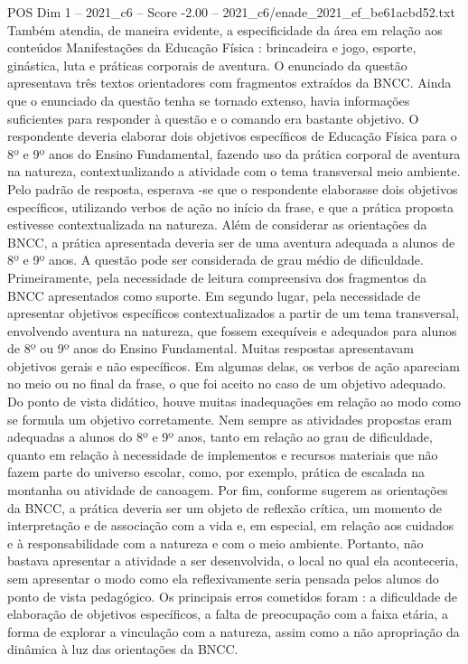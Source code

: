 \begin{textsample}{POS Dim 1 – 2021\_c6 – Score -2.00 – 2021\_c6/enade\_2021\_ef\_be61acbd52.txt}
Também atendia, de maneira evidente, a especificidade da área em relação aos conteúdos Manifestações da Educação Física : brincadeira e jogo, esporte, ginástica, luta e práticas corporais de aventura.
O enunciado da questão apresentava três textos orientadores com fragmentos extraídos da BNCC.
Ainda que o enunciado da questão tenha se tornado extenso, havia informações suficientes para responder à questão e o comando era bastante objetivo.
O respondente deveria elaborar dois objetivos específicos de Educação Física para o 8º e 9º anos do Ensino Fundamental, fazendo uso da prática corporal de aventura na natureza, contextualizando a atividade com o tema transversal meio ambiente.
Pelo padrão de resposta, esperava -se que o respondente elaborasse dois objetivos específicos, utilizando verbos de ação no início da frase, e que a prática proposta estivesse contextualizada na natureza.
Além de considerar as orientações da BNCC, a prática apresentada deveria ser de uma aventura adequada a alunos de 8º e 9º anos.
A questão pode ser considerada de grau médio de dificuldade.
Primeiramente, pela necessidade de leitura compreensiva dos fragmentos da BNCC apresentados como suporte.
Em segundo lugar, pela necessidade de apresentar objetivos específicos contextualizados a partir de um tema transversal, envolvendo aventura na natureza, que fossem exequíveis e adequados para alunos de 8º ou 9º anos do Ensino Fundamental.
Muitas respostas apresentavam objetivos gerais e não específicos.
Em algumas delas, os verbos de ação apareciam no meio ou no final da frase, o que foi aceito no caso de um objetivo adequado.
Do ponto de vista didático, houve muitas inadequações em relação ao modo como se formula um objetivo corretamente.
Nem sempre as atividades propostas eram adequadas a alunos do 8º e 9º anos, tanto em relação ao grau de dificuldade, quanto em relação à necessidade de implementos e recursos materiais que não fazem parte do universo escolar, como, por exemplo, prática de escalada na montanha ou atividade de canoagem.
Por fim, conforme sugerem as orientações da BNCC, a prática deveria ser um objeto de reflexão crítica, um momento de interpretação e de associação com a vida e, em especial, em relação aos cuidados e à responsabilidade com a natureza e com o meio ambiente.
Portanto, não bastava apresentar a atividade a ser desenvolvida, o local no qual ela aconteceria, sem apresentar o modo como ela reflexivamente seria pensada pelos alunos do ponto de vista pedagógico.
Os principais erros cometidos foram : a dificuldade de elaboração de objetivos específicos, a falta de preocupação com a faixa etária, a forma de explorar a vinculação com a natureza, assim como a não apropriação da dinâmica à luz das orientações da BNCC.

\end{textsample}
